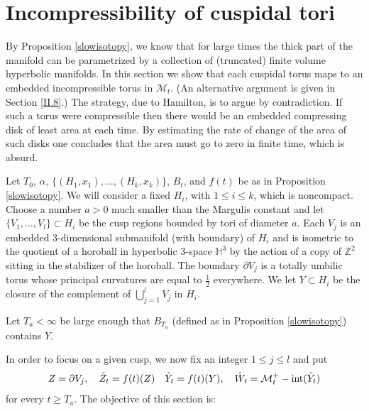 \documentclass[12pt]{amsart}
\newcommand{\D}{\partial}
\newcommand{\Int}{\operatorname{int}}
\newcommand{\M}{{\mathcal M}}
\newcommand{\Z}{{\mathbb Z}}
\numberwithin{equation}{section}
\theoremstyle{plain}
\theoremstyle{definition}
\theoremstyle{remark}
\begin{document}
\section{Incompressibility of cuspidal tori} \label{inctori}

By Proposition \ref{slowisotopy}, we know that for large times the thick 
part of the manifold can
be parametrized by a collection of (truncated) finite volume hyperbolic
manifolds.  In this section we show that each cuspidal torus
maps to an embedded incompressible torus in $\M_t$.  
(An alternative argument is given in Section \ref{II.8}.)
The strategy, due
to Hamilton, is to argue by contradiction. If such a torus were compressible
then there would be an embedded compressing disk of least area at each
time. By estimating the rate of change of the area of such disks one concludes
that the area must go to zero in finite time, which is absurd.

Let $T_0$, $\alpha$, $\{(H_1,x_1),\ldots,(H_k,x_k)\}$, $B_t$, and $f(t)$ be as
in Proposition \ref{slowisotopy}.  We will consider a fixed $H_i$, with $1\leq i\leq k$,  which
is noncompact.   Choose a  number
$a>0$ much smaller than the Margulis constant and let
$\{V_1,\ldots,V_l\}\subset H_i$
be  the cusp regions bounded by tori of diameter $a$.  Each
$V_j$ is an embedded $3$-dimensional submanifold (with boundary) of $H_i$
and is isometric to the quotient of a horoball in hyperbolic $3$-space $\mathbb{H}^3$
by the action of a copy of $\Z^2$ sitting in the stabilizer of the horoball.  The 
boundary $\D V_j$ is a totally umbilic torus whose principal curvatures are
equal to $\frac12$ everywhere.   We let $Y\subset H_i$ be the closure of the complement
of $\bigcup_{j=1}^l V_j$ in $H_i$.

Let $T_a<\infty$ be large enough  that  $B_{T_a}$  (defined as in Proposition \ref{slowisotopy}) 
contains $Y$. 

In order to focus on a given cusp, we now fix an integer $1\leq j \leq l$  and put
\begin{equation}
Z =  \partial V_{j},\quad\hat Z_t =  f(t)(Z)\\
\quad \hat Y_t =  f(t)(Y),\quad
\hat W_t =  \M_t^+ -  \Int(\hat Y_t)
\end{equation}
for every $t\geq T_a$.  The objective of this section is:
\end{document}
